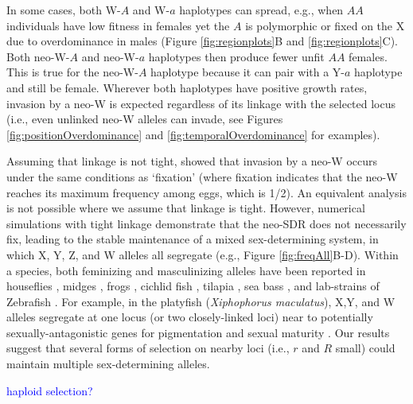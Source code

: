 \documentclass[12pt]{article}
\begin{document}
In some cases, both W-$A$ and W-$a$ haplotypes can spread, e.g., when $AA$ individuals have low fitness in females yet the $A$ is polymorphic or fixed on the X due to overdominance in males (Figure \ref{fig:regionplots}B and \ref{fig:regionplots}C).
Both neo-W-$A$ and neo-W-$a$ haplotypes then produce fewer unfit $AA$ females.
This is true for the neo-W-$A$ haplotype because it can pair with a Y-$a$ haplotype and still be female. 
Wherever both haplotypes have positive growth rates, invasion by a neo-W is expected regardless of its linkage with the selected locus (i.e., even unlinked neo-W alleles can invade, see Figures \ref{fig:positionOverdominance} and \ref{fig:temporalOverdominance} for examples). 

Assuming that linkage is not tight, \citet{vanDoorn:2010hu} showed that invasion by a neo-W occurs under the same conditions as `fixation' (where fixation indicates that the neo-W reaches its maximum frequency among eggs, which is 1/2). 
An equivalent analysis is not possible where we assume that linkage is tight. 
However, numerical simulations with tight linkage demonstrate that the neo-SDR does not necessarily fix, leading to the stable maintenance of a mixed sex-determining system, in which X, Y, Z, and W alleles all segregate (e.g., Figure \ref{fig:freqAll}B-D). 
Within a species, both feminizing and masculinizing alleles have been reported in houseflies \citep{Macdonald1978}, midges \citep{Thompson1971}, frogs \citep{Ogata:2007jm}, cichlid fish \citep{Ser:2010iq}, tilapia \citep{Lee2004}, sea bass \citep{Vandeputte2007}, and lab-strains of Zebrafish \citep{Liew2012,Wilson2014}. 
For example, in the platyfish (\textit{Xiphophorus maculatus}), X,Y, and W alleles segregate at one locus (or two closely-linked loci) near to potentially sexually-antagonistic genes for pigmentation and sexual maturity \citep{Kallman1965,Kallman1968, Volff2001, Schultheis2006}. 
Our results suggest that several forms of selection on nearby loci (i.e., $r$ and $R$ small) could maintain multiple sex-determining alleles. 

\textcolor{blue}{haploid selection?}
 
\end{document}
